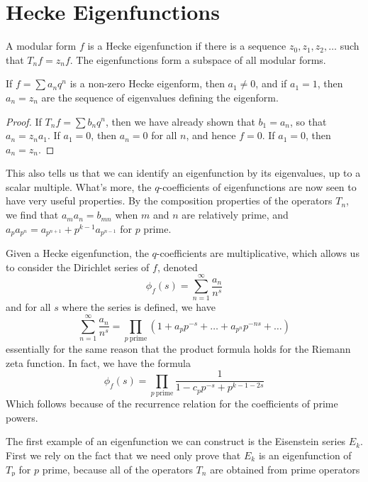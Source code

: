 \section{Hecke Eigenfunctions}

A modular form $f$ is a Hecke eigenfunction if there is a sequence $z_0, z_1, z_2, \dots$ such that $T_n f = z_n f$. The eigenfunctions form a subspace of all modular forms.

\begin{theorem}
    If $f = \sum a_n q^n$ is a non-zero Hecke eigenform, then $a_1 \neq 0$, and if $a_1 = 1$, then $a_n = z_n$ are the sequence of eigenvalues defining the eigenform.
\end{theorem}
\begin{proof}
    If $T_n f = \sum b_n q^n$, then we have already shown that $b_1 = a_n$, so that $a_n = z_n a_1$. If $a_1 = 0$, then $a_n = 0$ for all $n$, and hence $f = 0$. If $a_1 = 0$, then $a_n = z_n$.
\end{proof}

This also tells us that we can identify an eigenfunction by its eigenvalues, up to a scalar multiple. What's more, the $q$-coefficients of eigenfunctions are now seen to have very useful properties. By the composition properties of the operators $T_n$, we find that $a_m a_n = b_{mn}$ when $m$ and $n$ are relatively prime, and $a_p a_{p^n} = a_{p^{n+1}} + p^{k-1} a_{p^{n-1}}$ for $p$ prime.

Given a Hecke eigenfunction, the $q$-coefficients are multiplicative, which allows us to consider the Dirichlet series of $f$, denoted
%
\[ \phi_f(s) = \sum_{n = 1}^\infty \frac{a_n}{n^s} \]
%
and for all $s$ where the series is defined, we have
%
\[ \sum_{n = 1}^\infty \frac{a_n}{n^s} = \prod_{p\ \text{prime}} (1 + a_p p^{-s} + \dots + a_{p^n} p^{-ns} + \dots) \]
%
essentially for the same reason that the product formula holds for the Riemann zeta function. In fact, we have the formula
%
\[ \phi_f(s) = \prod_{p\ \text{prime}} \frac{1}{1 - c_p p^{-s} + p^{k-1-2s}} \]
%
Which follows because of the recurrence relation for the coefficients of prime powers.

The first example of an eigenfunction we can construct is the Eisenstein series $E_k$. First we rely on the fact that we need only prove that $E_k$ is an eigenfunction of $T_p$ for $p$ prime, because all of the operators $T_n$ are obtained from prime operators by composition. We reduce to the lattice definition of the series
%
\[ E_k(L) = \sum_{\substack{x \in L\\x \neq 0}} \frac{1}{|x|^k} \]
%
Now we have
%
\[ T_p E_k (L) = \sum_{(L':L) = p} \sum_{\substack{x \in L'\\x \neq 0}} \frac{1}{|x|^k} \]
%
Fix $x \in L$. If $x \in pL$ then $x \in L'$ for each of the $p + 1$ index $p$ sublattices of $L$. If $x$ is not in $pL$ then it belongs to exactly one of the sublattices $L'$, since these sublattices intersect trivially. It follows that
%
\[ T_p E_k (L) = E_k(L) + p E_k(pL) = (1 + p^{1-k}) E_k(L) \]
%
and thus $E_k$ is an eigenfunction. This shows that the divisor functions $\sigma_k$ are multiplicative, but this is already obvious from their definition.

